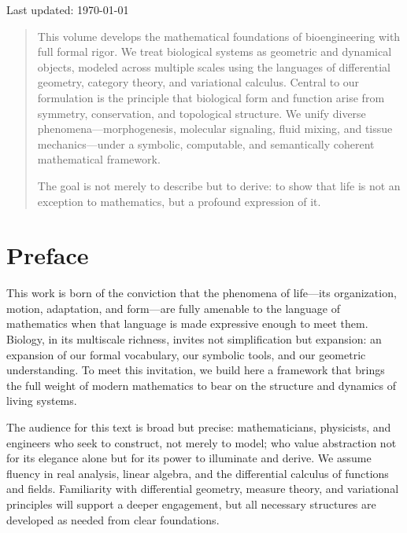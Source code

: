 \vspace{2cm}
\begin{center}
{\normalsize Last updated: \today\par}
\end{center}

\newpage


\begin{abstract}
This volume develops the mathematical foundations of bioengineering with full formal rigor. We treat biological systems as geometric and dynamical objects, modeled across multiple scales using the languages of differential geometry, category theory, and variational calculus. Central to our formulation is the principle that biological form and function arise from symmetry, conservation, and topological structure. We unify diverse phenomena—morphogenesis, molecular signaling, fluid mixing, and tissue mechanics—under a symbolic, computable, and semantically coherent mathematical framework.

The goal is not merely to describe but to derive: to show that life is not an exception to mathematics, but a profound expression of it.
\end{abstract}

\tableofcontents
\pagebreak

\section*{Preface}

This work is born of the conviction that the phenomena of life—its organization, motion, adaptation, and form—are fully amenable to the language of mathematics when that language is made expressive enough to meet them. Biology, in its multiscale richness, invites not simplification but expansion: an expansion of our formal vocabulary, our symbolic tools, and our geometric understanding. To meet this invitation, we build here a framework that brings the full weight of modern mathematics to bear on the structure and dynamics of living systems.

The audience for this text is broad but precise: mathematicians, physicists, and engineers who seek to construct, not merely to model; who value abstraction not for its elegance alone but for its power to illuminate and derive. We assume fluency in real analysis, linear algebra, and the differential calculus of functions and fields. Familiarity with differential geometry, measure theory, and variational principles will support a deeper engagement, but all necessary structures are developed as needed from clear foundations.

